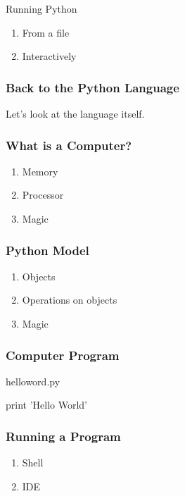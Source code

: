 \begin{frame}[fragile]

\begin{block}{Running Python}
\begin{enumerate}
\item From a file
\item Interactively
\end{enumerate}
\end{block}

\end{frame}

\begin{frame}[fragile]
\frametitle{Back to the Python Language}
Let's look at the language itself.
\end{frame}

\begin{frame}[fragile]
\frametitle{What is a Computer?}

\begin{enumerate}
\item Memory
\item Processor
\item Magic
\end{enumerate}
\end{frame}

\begin{frame}[fragile]
\frametitle{Python Model}

\begin{enumerate}
\item Objects
\item Operations on objects
\item Magic
\end{enumerate}
\end{frame}

\begin{frame}[fragile]
\frametitle{Computer Program}

\begin{block}{helloword.py}
\begin{python}
print 'Hello World'
\end{python}
\end{block}
\end{frame}

\begin{frame}[fragile]
\frametitle{Running a Program}
\begin{enumerate}
\item Shell
\item IDE
\end{enumerate}
\end{frame}

